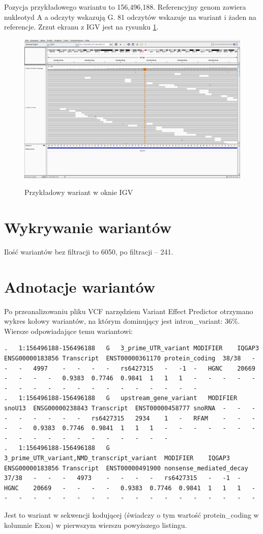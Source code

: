 \documentclass[a4paper]{article}
\begin{document}
Pozycja przykładowego wariantu to 156,496,188.
Referencyjny genom zawiera nukleotyd A a odczyty wskazują G.
81 odczytów wskazuje na wariant i żaden na referencje.
Zrzut ekranu z IGV jest na rysunku \ref{fig:igv}.

\begin{figure}[h]
    \centering
    \includegraphics[width=1.0\textwidth]{sampleVariant.png}
    \label{fig:igv}
    \caption[]{Przykładowy wariant w oknie IGV}
\end{figure}


\section{Wykrywanie wariantów}  

Ilość wariantów bez filtracji to 6050, po filtracji -- 241.

\section{Adnotacje wariantów}  
Po przeanalizowaniu pliku VCF narzędziem Variant Effect Predictor otrzymano wykres kołowy wariantów, na którym dominujący jest intron_variant: 36\%.
Wiersze odpowiadające temu wariantowi:
\begin{verbatim}
.	1:156496188-156496188	G	3_prime_UTR_variant	MODIFIER	IQGAP3	ENSG00000183856	Transcript	ENST00000361170	protein_coding	38/38	-	-	-	4997	-	-	-	-	rs6427315	-	-1	-	HGNC	20669	-	-	-	-	0.9383	0.7746	0.9841	1	1	1	-	-	-	-	-	-	-	-	-	-	-	-	-	-	-	-	-	-	-
.	1:156496188-156496188	G	upstream_gene_variant	MODIFIER	snoU13	ENSG00000238843	Transcript	ENST00000458777	snoRNA	-	-	-	-	-	-	-	-	-	rs6427315	2934	1	-	RFAM	-	-	-	-	-	0.9383	0.7746	0.9841	1	1	1	-	-	-	-	-	-	-	-	-	-	-	-	-	-	-	-	-	-	-
.	1:156496188-156496188	G	3_prime_UTR_variant,NMD_transcript_variant	MODIFIER	IQGAP3	ENSG00000183856	Transcript	ENST00000491900	nonsense_mediated_decay	37/38	-	-	-	4973	-	-	-	-	rs6427315	-	-1	-	HGNC	20669	-	-	-	-	0.9383	0.7746	0.9841	1	1	1	-	-	-	-	-	-	-	-	-	-	-	-	-	-	-	-	-	-	-
\end{verbatim}
Jest to wariant w sekwencji kodującej (świadczy o tym wartość protein_coding w kolumnie Exon) w pierwszym wierszu powyższego listingu.
\end{document}
